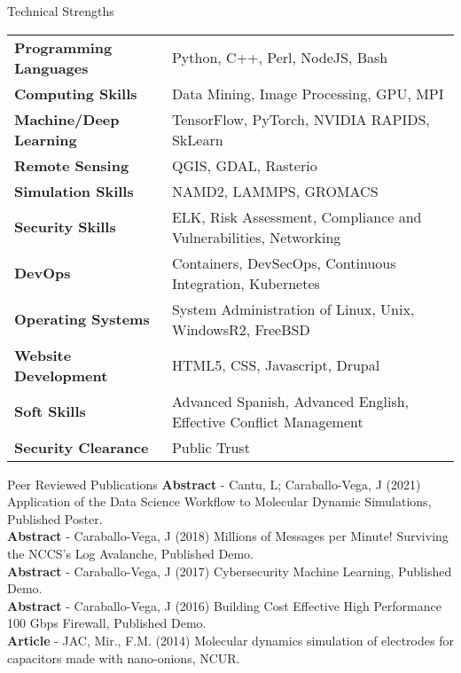 \documentclass{resume} %
\begin{document}

\begin{rSection}{Technical Strengths}

\begin{tabular}{ @{} >{\bfseries}l @{\hspace{6ex}} l }
Programming Languages & Python, C++, Perl, NodeJS, Bash \\
Computing Skills & Data Mining, Image Processing, GPU, MPI \\
Machine/Deep Learning &  TensorFlow, PyTorch, NVIDIA RAPIDS, SkLearn \\
Remote Sensing & QGIS, GDAL, Rasterio \\
Simulation Skills & NAMD2, LAMMPS, GROMACS \\
Security Skills & ELK, Risk Assessment, Compliance and Vulnerabilities, Networking \\
DevOps & Containers, DevSecOps, Continuous Integration, Kubernetes \\
Operating Systems & System Administration of Linux, Unix, WindowsR2, FreeBSD \\
Website Development & HTML5, CSS, Javascript, Drupal \\
Soft Skills & Advanced Spanish, Advanced English, Effective Conflict Management \\
Security Clearance & Public Trust

\end{tabular}

\end{rSection}

\begin{rSection}{Peer Reviewed Publications}
\textbf{Abstract} - Cantu, L; Caraballo-Vega, J (2021) Application of the Data Science Workflow to Molecular Dynamic Simulations, Published Poster. \\
\textbf{Abstract} - Caraballo-Vega, J (2018) Millions of Messages per Minute! Surviving the NCCS's Log Avalanche, Published Demo. \\
\textbf{Abstract} - Caraballo-Vega, J (2017) Cybersecurity Machine Learning, Published Demo. \\
\textbf{Abstract} - Caraballo-Vega, J (2016) Building Cost Effective High Performance 100 Gbps Firewall, Published Demo. \\
\textbf{Article} - JAC, Mir., F.M. (2014) Molecular dynamics simulation of electrodes for capacitors made with nano-onions, NCUR. \\
\end{rSection}
\end{document}
